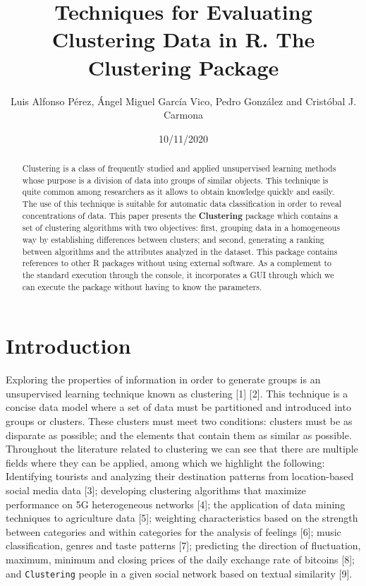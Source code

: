\documentclass[
]{article}
\title{Techniques for Evaluating Clustering Data in R. The
\textbf{Clustering} Package}
\author{Luis Alfonso Pérez, Ángel Miguel García Vico, Pedro González and
Cristóbal J. Carmona}
\date{10/11/2020}
\begin{document}
\maketitle
\begin{abstract}
Clustering is a class of frequently studied and applied unsupervised
learning methods whose purpose is a division of data into groups of
similar objects. This technique is quite common among researchers as it
allows to obtain knowledge quickly and easily. The use of this technique
is suitable for automatic data classification in order to reveal
concentrations of data. This paper presents the \textbf{Clustering}
package which contains a set of clustering algorithms with two
objectives: first, grouping data in a homogeneous way by establishing
differences between clusters; and second, generating a ranking between
algorithms and the attributes analyzed in the dataset. This package
contains references to other R packages without using external software.
As a complement to the standard execution through the console, it
incorporates a GUI through which we can execute the package without
having to know the parameters.
\end{abstract}

\hypertarget{introduction}{%
\section{Introduction}\label{introduction}}

Exploring the properties of information in order to generate groups is
an unsupervised learning technique known as clustering {[}1{]} {[}2{]}.
This technique is a concise data model where a set of data must be
partitioned and introduced into groups or clusters. These clusters must
meet two conditions: clusters must be as disparate as possible; and the
elements that contain them as similar as possible. Throughout the
literature related to clustering we can see that there are multiple
fields where they can be applied, among which we highlight the
following: Identifying tourists and analyzing their destination patterns
from location-based social media data {[}3{]}; developing clustering
algorithms that maximize performance on 5G heterogeneous networks
{[}4{]}; the application of data mining techniques to agriculture data
{[}5{]}; weighting characteristics based on the strength between
categories and within categories for the analysis of feelings {[}6{]};
music classification, genres and taste patterns {[}7{]}; predicting the
direction of fluctuation, maximum, minimum and closing prices of the
daily exchange rate of bitcoins {[}8{]}; and \texttt{Clustering} people
in a given social network based on textual similarity {[}9{]}.
\end{document}
